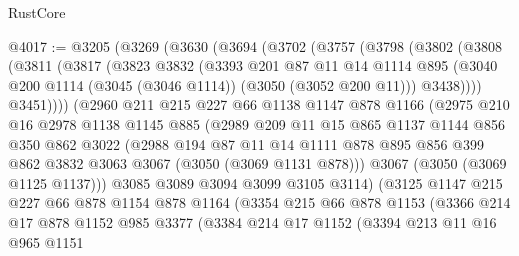 \begin{lexlean}{RustCore}
\begin{coremodule}
@4017 := @3205
    (@3269
      (@3630
        (@3694
          (@3702
            (@3757
              (@3798
                (@3802
                  (@3808
                    (@3811
                      (@3817
                        (@3823
                          @3832
                          (@3393
                            @201
                            @87
                            @11
                            @14
                            @1114
                            @895
                            (@3040 @200 @1114 (@3045 (@3046 @1114)) (@3050 (@3052 @200 @11)))
                            @3438))))
                    @3451))))
            (@2960
              @211
              @215
              @227
              @66
              @1138
              @1147
              @878
              @1166
              (@2975
                @210
                @16
                @2978
                @1138
                @1145
                @885
                (@2989
                  @209
                  @11
                  @15
                  @865
                  @1137
                  @1144
                  @856
                  @350
                  @862
                  @3022
                  (@2988
                    @194
                    @87
                    @11
                    @14
                    @1111
                    @878
                    @895
                    @856
                    @399
                    @862
                    @3832
                    @3063
                    @3067
                    (@3050 (@3069 @1131 @878)))
                  @3067
                  (@3050 (@3069 @1125 @1137)))
                @3085
                @3089
                @3094
                @3099
                @3105
                @3114)
              (@3125
                @1147
                @215
                @227
                @66
                @878
                @1154
                @878
                @1164
                (@3354
                  @215
                  @66
                  @878
                  @1153
                  (@3366
                    @214
                    @17
                    @878
                    @1152
                    @985
                    @3377
                    (@3384
                      @214
                      @17
                      @1152
                      (@3394
                        @213
                        @11
                        @16
                        @965
                        @1151

\end{coremodule}
\end{lexlean}
